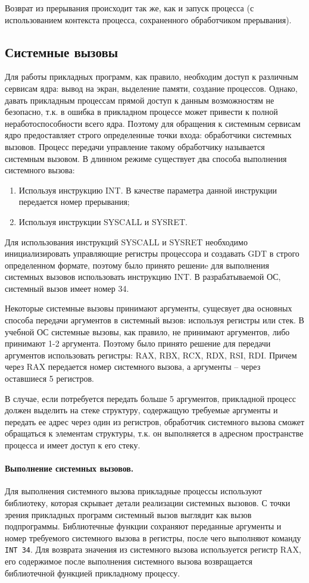 Возврат из прерывания происходит так же, как и запуск процесса (с использованием контекста процесса,
сохраненного обработчиком прерывания).


\subsection{Системные вызовы}
Для работы прикладных программ, как правило, необходим доступ к различным сервисам ядра: вывод
на экран, выделение памяти, создание процессов. Однако, давать прикладным процессам прямой доступ
к данным возможностям не безопасно, т.к. в ошибка в прикладном процессе может привести к полной
неработоспособности всего ядра. Поэтому для обращения к системным сервисам ядро предоставляет
строго определенные точки входа: обработчики системных вызовов. Процесс передачи управление
такому обработчику называется системным вызовом. В длинном режиме существует два способа
выполнения системного вызова:
\begin{enumerate}[1.]
\item Используя инструкцию INT. В качестве параметра данной инструкции передается номер прерывания;
\item Используя инструкции SYSCALL и SYSRET.
\end{enumerate}

Для использования инструкций SYSCALL и SYSRET необходимо инициализировать управляющие регистры
процессора и создавать GDT в строго определенном формате, поэтому было принято решениe для
выполнения системных вызовов использовать инструкцию INT. В разрабатываемой ОС, системный вызов
имеет номер 34.

Некоторые системные вызовы принимают аргументы, сущесвует два основных способа передачи
аргументов в системный вызов: используя регистры или стек. В учебной ОС системные вызовы,
как правило, не принимают аргументов, либо принимают 1-2 аргумента. Поэтому было принято
решение для передачи аргументов использовать регистры: RAX, RBX, RCX, RDX, RSI, RDI.
Причем через RAX передается номер системного вызова, а аргументы -- через оставшиеся 5 регистров.

В случае, если потребуется передать больше 5 аргументов, прикладной процесс должен выделить
на стеке структуру, содержащую требуемые аргументы и передать ее адрес через один из регистров,
обработчик системного вызова сможет обращаться к элементам структуры, т.к. он выполняется в адресном
пространстве процесса и имеет доступ к его стеку.

\paragraph{Выполнение системных вызовов.}
Для выполнения системного вызова прикладные процессы используют библиотеку, которая
скрывает детали реализации системных вызовов. С точки зрения прикладных программ системный
вызов выглядит как вызов подпрограммы. Библиотечные функции сохраняют переданные аргументы и
номер требуемого системного вызова в регистры, после чего выполняют команду \texttt{INT 34}.
Для возврата значения из системного вызова используется регистр RAX, его содержимое после
выполнения системного вызова возвращается библиотечной функцией прикладному процессу.

